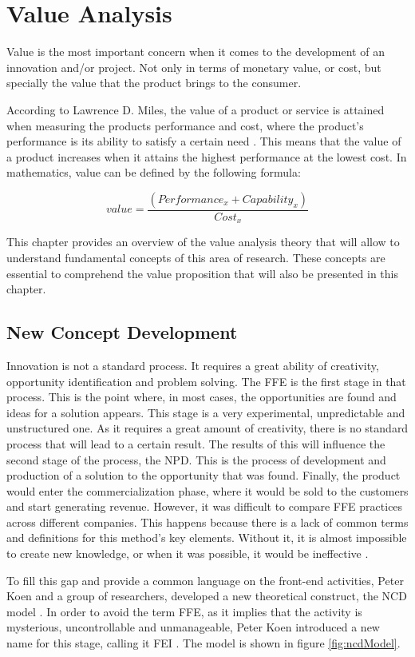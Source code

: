 \chapter{Value Analysis} %
\label{chap:valueAnalysis}

Value is the most important concern when it comes to the development of an innovation and/or project. Not only in terms of monetary value, or cost, but specially the value that the product brings to the consumer. 
\par 
According to Lawrence D. Miles, the value of a product or service is attained when measuring the products performance and cost, where the product's performance is its ability to satisfy a certain need \parencite{valueAnalysisAndEngineering}. This means that the value of a product increases when it attains the highest performance at the lowest cost. In mathematics, value can be defined by the following formula:
\par
$$value= \frac{(Performance_x + Capability_x)}{Cost_x}$$
\par

This chapter provides an overview of the value analysis theory that will allow to understand fundamental concepts of this area of research. These concepts are essential to comprehend the value proposition that will also be presented in this chapter.

\section{New Concept Development}
Innovation is not a standard process. It requires a great ability of creativity, opportunity identification and problem solving. The \gls{FFE} is the first stage in that process. This is the point where, in most cases, the opportunities are found and ideas for a solution appears. This stage is a very experimental, unpredictable and unstructured one. As it requires a great amount of creativity, there is no standard process that will lead to a certain result. The results of this will influence the second stage of the process, the \gls{NPD}. This is the process of development and production of a solution to the opportunity that was found. Finally, the product would enter the commercialization phase, where it would be sold to the customers and start generating revenue. However, it was difficult to compare \gls{FFE} practices across different companies. This happens because there is a lack of common terms and definitions for this method's key elements. Without it, it is almost impossible to create new knowledge, or when it was possible, it would be ineffective \parencite{fuzzyFrontEndMethodsToolsThecniques}.
\par
To fill this gap and provide a common language on the front-end activities, Peter Koen and a group of researchers, developed a new theoretical construct, the \gls{NCD} model \parencite{commonLanguageForFFE}. In order to avoid the term \gls{FFE}, as it implies that the activity is mysterious, uncontrollable and unmanageable, Peter Koen introduced a new name for this stage, calling it \gls{FEI} \parencite{managingFrontEndInnovation}. The model is shown in figure \ref{fig:ncdModel}.
\par

